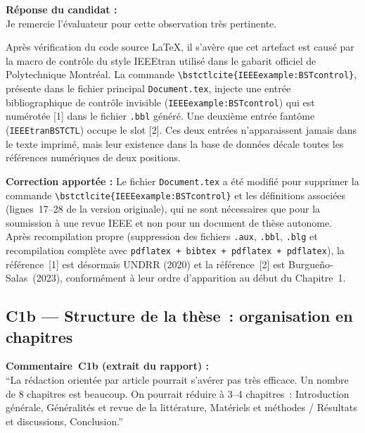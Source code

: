 \documentclass[12pt,a4paper]{article}
\newcommand{\Commentaire}[2]{%
  \begin{reviewerbox}
    \textbf{Commentaire~#1 (extrait du rapport) :}\\#2
  \end{reviewerbox}%
}
\newcommand{\Reponse}[1]{%
  \begin{responsebox}
    \textbf{Réponse du candidat :}\\#1
  \end{responsebox}%
}
\begin{document}
\Reponse{
Je remercie l'évaluateur pour cette observation très pertinente.

Après vérification du code source \LaTeX{}, il s'avère que cet artefact est causé par la macro de contrôle du style IEEEtran utilisé dans le gabarit officiel de Polytechnique Montréal. La commande \texttt{\textbackslash bstctlcite\{IEEEexample:BSTcontrol\}}, présente dans le fichier principal \texttt{Document.tex}, injecte une entrée bibliographique de contrôle invisible (\texttt{IEEEexample:BSTcontrol}) qui est numérotée [1] dans le fichier \texttt{.bbl} généré. Une deuxième entrée fantôme (\texttt{IEEEtranBSTCTL}) occupe le slot [2]. Ces deux entrées n'apparaissent jamais dans le texte imprimé, mais leur existence dans la base de données décale toutes les références numériques de deux positions.

\textbf{Correction apportée :} Le fichier \texttt{Document.tex} a été modifié pour supprimer la commande \texttt{\textbackslash bstctlcite\{IEEEexample:BSTcontrol\}} et les définitions associées (lignes~17--28 de la version originale), qui ne sont nécessaires que pour la soumission à une revue IEEE et non pour un document de thèse autonome. Après recompilation propre (suppression des fichiers \texttt{.aux}, \texttt{.bbl}, \texttt{.blg} et recompilation complète avec \texttt{pdflatex~+~bibtex~+~pdflatex~+~pdflatex}), la référence~[1] est désormais \textsc{UNDRR} (2020) et la référence~[2] est Burgue\~{n}o-Salas~(2023), conformément à leur ordre d'apparition au début du Chapitre~1.
}

\subsection*{C1b --- Structure de la thèse~: organisation en chapitres}

\Commentaire{C1b}{
  ``La rédaction orientée par article pourrait s'avérer pas très efficace. Un nombre de 8 chapitres
  est beaucoup. On pourrait réduire à 3--4 chapitres~: Introduction générale, Généralités et revue
  de la littérature, Matériels et méthodes / Résultats et discussions, Conclusion.''
}
\end{document}
